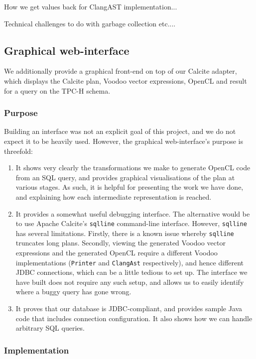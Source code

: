 How we get values back for ClangAST implementation...

Technical challenges to do with garbage collection etc....

\subsection{Graphical web-interface}

We additionally provide a graphical front-end on top of our Calcite adapter, which displays the Calcite plan, Voodoo vector expressions, OpenCL and result for a query on the TPC-H schema.

\subsubsection{Purpose}

Building an interface was not an explicit goal of this project, and we do not expect it to be heavily used. However, the graphical web-interface's purpose is threefold:

\begin{enumerate}
\item It shows very clearly the transformations we make to generate OpenCL code from an SQL query, and provides graphical visualisations of the plan at various stages. As such, it is helpful for presenting the work we have done, and explaining how each intermediate representation is reached.
\item It provides a somewhat useful debugging interface. The alternative would be to use Apache Calcite's \texttt{sqlline} command-line interface. However, \texttt{sqlline} has several limitations. Firstly, there is a known issue whereby \texttt{sqlline} truncates long plans. Secondly, viewing the generated Voodoo vector expressions and the generated OpenCL require a different Voodoo implementations (\texttt{Printer} and \texttt{ClangAst} respectively), and hence different JDBC connections, which can be a little tedious to set up. The interface we have built does not require any such setup, and allows us to easily identify where a buggy query has gone wrong.
\item It proves that our database is JDBC-compliant, and provides sample Java code that includes connection configuration. It also shows how we can handle arbitrary SQL queries.
\end{enumerate}

\subsubsection{Implementation}

